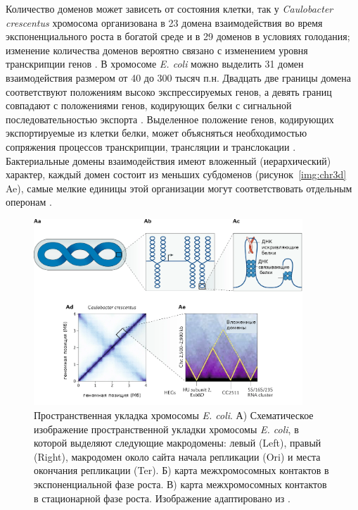 Количество доменов может зависеть от состояния клетки, так у \textit{Caulobacter crescentus} хромосома организована в 23 домена взаимодействия во время экспоненциального роста в богатой среде и в 29 доменов в условиях голодания; изменение количества доменов вероятно связано с изменением уровня транскрипции генов \cite{dame2020chromosome}. В хромосоме \textit{E. coli} можно выделить 31 домен взаимодействия размером от 40 до 300 тысяч п.н. Двадцать две границы домена соответствуют положениям высоко экспрессируемых генов, а девять границ совпадают с положениями генов, кодирующих белки с сигнальной последовательностью экспорта \cite{lioy2018multiscale}. Выделенное положение генов, кодирующих экспортируемые из клетки белки, может объясняться необходимостью сопряжения процессов транскрипции, трансляции и транслокации \cite{woldringh2002role}. Бактериальные домены взаимодействия имеют вложенный (иерархический) характер, каждый домен состоит из меньших субдоменов (рисунок~\ref{img:chr3d} Ae), самые мелкие единицы этой организации могут соответствовать отдельным оперонам \cite{dame2020chromosome}.

\begin{figure}[!ht] 
  \center
  \includegraphics [width=0.9\textwidth] {Dissertation/images/lit/chromosome3d_1.png}
  \caption{Пространственная укладка хромосомы \textit{E. coli}. А) Схематическое изображение пространственной укладки хромосомы \textit{E. coli}, в которой выделяют следующие макродомены: левый (Left), правый (Right), макродомен около сайта начала репликации (Ori) и места окончания репликации (Ter). Б) карта межхромосомных контактов в экспоненциальной фазе роста. В) карта межхромосомных контактов в стационарной фазе роста. Изображение адаптировано из \cite{dame2020chromosome}.} 
  \label{img:coli_3d}  
\end{figure}


